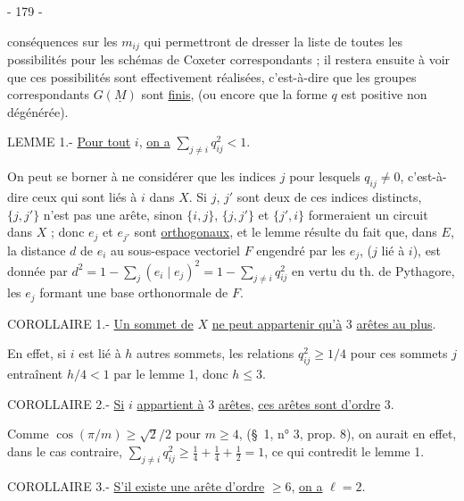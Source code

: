 \begin{center}- 179 -\end{center}

conséquences sur les $m_{ij}$ qui permettront de dresser la liste de toutes les possibilités pour les schémas de Coxeter correspondants ; il restera ensuite à voir que ces possibilités sont effectivement réalisées, c'est-à-dire que les groupes correspondants $G(\underline M)$ sont \uline{finis}, (ou encore que la forme $q$ est positive non dégénérée).

LEMME 1.- \uline{Pour tout} $i$, \uline{on a} $\displaystyle\sum_{j\ne i}q_{ij}^2<1$.

On peut se borner à ne considérer que les indices $j$ pour lesquels $q_{ij}\ne0$, c'est-à-dire ceux qui sont liés à $i$ dans $X$. Si $j$, $j'$ sont deux de ces indices distincts, $\{j,j'\}$ n'est pas une arête, sinon $\{i,j\}$, $\{j,j'\}$ et $\{j',i\}$ formeraient un circuit dans $X$ ; donc $e_j$ et $e_{j'}$ sont \uline{orthogonaux}, et le lemme résulte du fait que, dans $E$, la distance $d$ de $e_i$ au sous-espace vectoriel $F$ engendré par les $e_j$, ($j$ lié à $i$), est donnée par $\displaystyle d^2=1-\sum_j(e_i\mid e_j)^2=1-\sum_{j\ne i}q_{ij}^2$ en vertu du th. de Pythagore, les $e_j$ formant une base orthonormale de $F$.

COROLLAIRE 1.- \uline{Un sommet de} $X$ \uline{ne peut appartenir qu'à} 3 \uline{arêtes au plus}.

En effet, si $i$ est lié à $h$ autres sommets, les relations $q_{ij}^2\geq1/4$ pour ces sommets $j$ entraînent $h/4<1$ par le lemme 1, donc $h\leq3$.

COROLLAIRE 2.- \uline{Si} $i$ \uline{appartient à} 3 \uline{arêtes}, \uline{ces arêtes sont d'ordre} 3.

Comme $\cos(\pi/m)\geq\sqrt2/2$ pour $m\geq4$, (\S\ 1, n° 3, prop. 8), on aurait en effet, dans le cas contraire, $\displaystyle\sum_{j\ne i}q_{ij}^2\geq\frac14+\frac14+\frac12=1$, ce qui contredit le lemme 1.

COROLLAIRE 3.- \uline{S'il existe une arête d'ordre} $\geq6$, \uline{on a} $\ell=2$.

